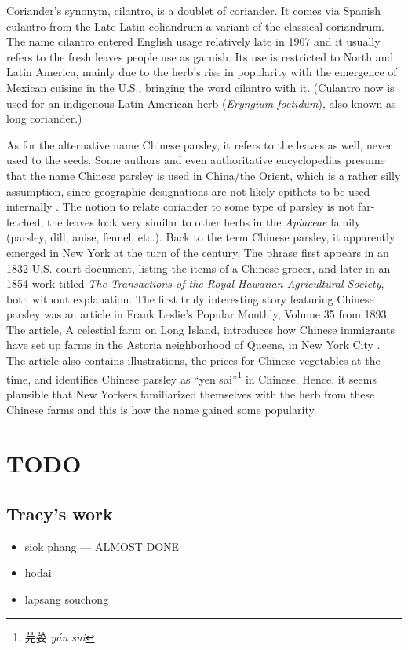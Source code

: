 \documentclass[12pt]{article}
\begin{document}
Coriander’s synonym, cilantro, is a doublet of coriander. It comes via Spanish culantro from the Late Latin coliandrum a variant of the classical coriandrum. The name cilantro entered English usage relatively late in 1907 \parencite{harper_coriander_nodate} and it usually refers to the fresh leaves people use as garnish. Its use is restricted to North and Latin America, mainly due to the herb’s rise in popularity with the emergence of Mexican cuisine in the U.S., bringing the word cilantro with it. (Culantro now is used for an indigenous Latin American herb (\textit{Eryngium foetidum}), also known as long coriander.)

As for the alternative name Chinese parsley, it refers to the leaves as well, never used to the seeds. Some authors and even authoritative encyclopedias presume that the name Chinese parsley is used in China/the Orient, which is a rather silly assumption, since geographic designations are not likely epithets to be used internally \parencite[cf.][]{davidson_oxford_2014, oconnell_book_2016}. The notion to relate coriander to some type of parsley is not far-fetched, the leaves look very similar to other herbs in the \textit{Apiaceae} family (parsley, dill, anise, fennel, etc.). Back to the term Chinese parsley, it apparently emerged in New York at the turn of the century. The phrase first appears in an 1832 U.S. court document, listing the items of a Chinese grocer, and later in an 1854 work titled \textit{The Transactions of the Royal Hawaiian Agricultural Society}, both without explanation. The first truly interesting story featuring Chinese parsley was an article in Frank Leslie's Popular Monthly, Volume 35 from 1893. The article, A celestial farm on Long Island, introduces how Chinese immigrants have set up farms in the Astoria neighborhood of Queens, in New York City \parencite{seitz_celestial_1893} . The article also contains illustrations, the prices for Chinese vegetables at the time, and identifies Chinese parsley as ``yen sai''\footnote{芫荽 \textit{yán sui}} in Chinese. Hence, it seems plausible that New Yorkers familiarized themselves with the herb from these Chinese farms and this is how the name gained some popularity.





\section{TODO}
\subsection{Tracy's work}
\begin{itemize}
    \item siok phang --- ALMOST DONE
    \item hodai
    \item lapsang souchong
\end{itemize}
\end{document}
